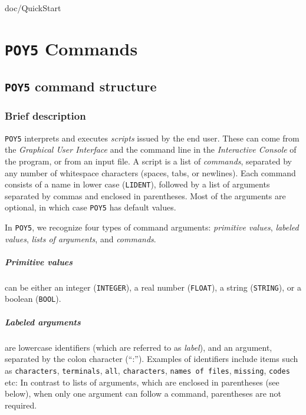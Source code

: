 \documentclass[11pt]{book}
\newcommand{\commandstyle}[1]{\texttt{#1}}
\newcommand{\poyargument}[1]{\commandstyle{#1}}
\newcommand{\poystring}{\commandstyle{STRING}\xspace}
\newcommand{\poyfloat}{\commandstyle{FLOAT}\xspace}
\newcommand{\poyint}{\commandstyle{INTEGER}\xspace}
\newcommand{\poybool}{\commandstyle{BOOL}}
\newcommand{\poylident}{\commandstyle{LIDENT}\xspace}
\newcommand{\poy}{\commandstyle{POY5}\xspace}
\begin{document}

 {doc/QuickStart}

\chapter{\poy Commands}\label{commands}

\section{\poy command structure}

\subsection{Brief description} \label{commands}

\poy interprets and executes \emph{scripts} issued by the end user.  These can
come from the \emph{Graphical User Interface} and the command line in the 
\emph{Interactive Console} of the program, or from an input file. A script is a 
list of \emph{commands}, separated by any number of whitespace characters 
(spaces, tabs, or newlines). Each command consists of a name in lower case 
(\poylident), followed by a list of arguments separated by commas and enclosed 
in parentheses. Most of the arguments are optional, in which case \poy has default 
values.

In \poy, we recognize four types of command arguments: \emph{primitive values},
\emph{labeled values}, \emph{lists of arguments}, and \emph{commands}.

\paragraph{Primitive values} can be either an integer (\poyint), a real number
(\poyfloat), a string (\poystring), or a boolean (\poybool).

\paragraph{Labeled arguments} are lowercase identifiers (which are referred to as
\emph{label}), and an argument, separated by the colon character (``:''). Examples 
of identifiers include items such as \poyargument{characters}, \poyargument{terminals}, 
\poyargument{all}, \poyargument{characters}, \texttt{names of files}, \poyargument{missing},
\poyargument{codes} etc:  In contrast to lists of arguments, which are enclosed in parentheses 
(see below), when only one argument can follow a command, parentheses are not required.
\end{document}
